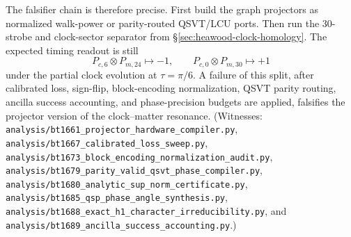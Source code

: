 The falsifier chain is therefore precise.  First build the graph projectors as
normalized walk-power or parity-routed QSVT/LCU ports.  Then run the $30$-strobe
and clock-sector separator from \S\ref{sec:heawood-clock-homology}.  The expected
timing readout is still
\[
P_{c,6}\otimes P_{m,24}\mapsto -1,
\qquad
P_{c,0}\otimes P_{m,30}\mapsto +1
\]
under the partial clock evolution at $\tau=\pi/6$.  A failure of this split,
after calibrated loss, sign-flip, block-encoding normalization, QSVT parity
routing, ancilla success accounting, and phase-precision budgets are applied,
falsifies the projector version of the clock--matter resonance.  (Witnesses:
\texttt{analysis/bt1661\_projector\_hardware\_compiler.py},
\texttt{analysis/bt1667\_calibrated\_loss\_sweep.py},
\texttt{analysis/bt1673\_block\_encoding\_normalization\_audit.py},
\texttt{analysis/bt1679\_parity\_valid\_qsvt\_phase\_compiler.py},
\texttt{analysis/bt1680\_analytic\_sup\_norm\_certificate.py},
\texttt{analysis/bt1685\_qsp\_phase\_angle\_synthesis.py},
\texttt{analysis/bt1688\_exact\_h1\_character\_irreducibility.py}, and
\texttt{analysis/bt1689\_ancilla\_success\_accounting.py}.)
